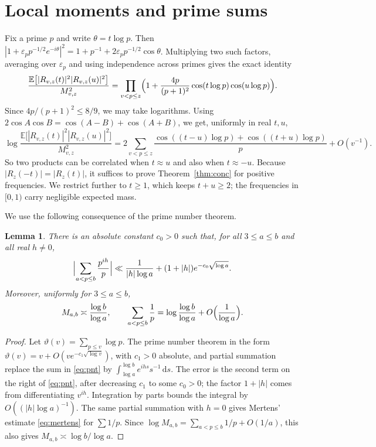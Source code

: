 \documentclass[11pt]{amsart}
\newtheorem{lemma}[theorem]{Lemma}
\theoremstyle{remark}
\numberwithin{equation}{section}
\newcommand{\E}{\mathbb{E}}
\newcommand{\dd}{\,\mathrm{d}}
\begin{document}
\section{Local moments and prime sums}\label{sec:local}

Fix a prime $p$ and write $\theta=t\log p$. Then $|1+\varepsilon_pp^{-1/2}e^{-i\theta}|^2=1+p^{-1}+2\varepsilon_pp^{-1/2}\cos\theta$. Multiplying two such factors, averaging over $\varepsilon_p$ and using independence across primes gives the exact identity
\begin{equation}\label{eq:4mom}
\frac{\E\bigl[|R_{v,z}(t)|^2|R_{v,z}(u)|^2\bigr]}{M_{v,z}^2}=\prod_{v<p\le z}\Bigl(1+\frac{4p}{(p+1)^2}\cos(t\log p)\cos(u\log p)\Bigr).
\end{equation}
Since $4p/(p+1)^2\le 8/9$, we may take logarithms. Using $2\cos A\cos B=\cos(A-B)+\cos(A+B)$, we get, uniformly in real $t,u$,
\begin{equation}\label{eq:4momlog}
\log\frac{\E\bigl[|R_{v,z}(t)|^2|R_{v,z}(u)|^2\bigr]}{M_{v,z}^2}=2\sum_{v<p\le z}\frac{\cos((t-u)\log p)+\cos((t+u)\log p)}{p}+O(v^{-1}).
\end{equation}
So two products can be correlated when $t\approx u$ and also when $t\approx-u$. Because $|R_z(-t)|=|R_z(t)|$, it suffices to prove Theorem~\ref{thm:conc} for positive frequencies. We restrict further to $t\ge1$, which keeps $t+u\ge2$; the frequencies in $[0,1)$ carry negligible expected mass.

We use the following consequence of the prime number theorem.

\begin{lemma}\label{lem:pnt}
There is an absolute constant $c_0>0$ such that, for all $3\le a\le b$ and all real $h\ne0$,
\begin{equation}\label{eq:pnt}
\Bigl|\sum_{a<p\le b}\frac{p^{ih}}{p}\Bigr|\ll\frac{1}{|h|\log a}+(1+|h|)e^{-c_0\sqrt{\log a}} .
\end{equation}
Moreover, uniformly for $3\le a\le b$,
\begin{equation}\label{eq:mertens}
M_{a,b}\asymp\frac{\log b}{\log a},\qquad\sum_{a<p\le b}\frac1p=\log\frac{\log b}{\log a}+O\Bigl(\frac{1}{\log a}\Bigr).
\end{equation}
\end{lemma}

\begin{proof}
Let $\vartheta(v)=\sum_{p\le v}\log p$. The prime number theorem in the form $\vartheta(v)=v+O(ve^{-c_1\sqrt{\log v}})$, with $c_1>0$ absolute, and partial summation replace the sum in \eqref{eq:pnt} by $\int_{\log a}^{\log b}e^{ihs}s^{-1}\dd s$. The error is the second term on the right of \eqref{eq:pnt}, after decreasing $c_1$ to some $c_0>0$; the factor $1+|h|$ comes from differentiating $v^{ih}$. Integration by parts bounds the integral by $O((|h|\log a)^{-1})$. The same partial summation with $h=0$ gives Mertens' estimate \eqref{eq:mertens} for $\sum1/p$. Since $\log M_{a,b}=\sum_{a<p\le b}1/p+O(1/a)$, this also gives $M_{a,b}\asymp\log b/\log a$.
\end{proof}
\end{document}

